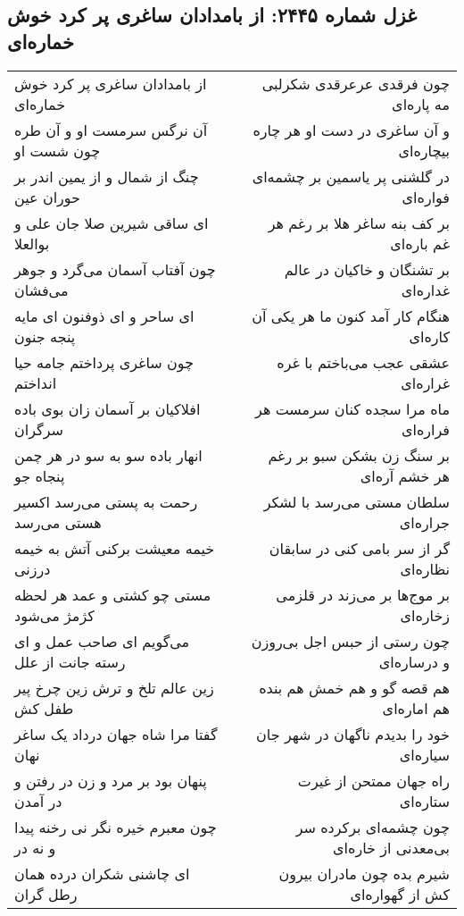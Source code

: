 \begin{center}
\section*{غزل شماره ۲۴۴۵: از بامدادان ساغری پر کرد خوش خماره‌ای}
\label{sec:2445}
\begin{longtable}{l p{0.5cm} r}
از بامدادان ساغری پر کرد خوش خماره‌ای
&&
چون فرقدی عرعرقدی شکرلبی مه پاره‌ای
\\
آن نرگس سرمست او و آن طره چون شست او
&&
و آن ساغری در دست او هر چاره بیچاره‌ای
\\
چنگ از شمال و از یمین اندر بر حوران عین
&&
در گلشنی پر یاسمین بر چشمه‌ای فواره‌ای
\\
ای ساقی شیرین صلا جان علی و بوالعلا
&&
بر کف بنه ساغر هلا بر رغم هر غم باره‌ای
\\
چون آفتاب آسمان می‌گرد و جوهر می‌فشان
&&
بر تشنگان و خاکیان در عالم غداره‌ای
\\
ای ساحر و ای ذوفنون ای مایه پنجه جنون
&&
هنگام کار آمد کنون ما هر یکی آن کاره‌ای
\\
چون ساغری پرداختم جامه حیا انداختم
&&
عشقی عجب می‌باختم با غره غراره‌ای
\\
افلاکیان بر آسمان زان بوی باده سرگران
&&
ماه مرا سجده کنان سرمست هر فراره‌ای
\\
انهار باده سو به سو در هر چمن پنجاه جو
&&
بر سنگ زن بشکن سبو بر رغم هر خشم آره‌ای
\\
رحمت به پستی می‌رسد اکسیر هستی می‌رسد
&&
سلطان مستی می‌رسد با لشکر جراره‌ای
\\
خیمه معیشت برکنی آتش به خیمه درزنی
&&
گر از سر بامی کنی در سابقان نظاره‌ای
\\
مستی چو کشتی و عمد هر لحظه کژمژ می‌شود
&&
بر موج‌ها بر می‌زند در قلزمی زخاره‌ای
\\
می‌گویم ای صاحب عمل و ای رسته جانت از علل
&&
چون رستی از حبس اجل بی‌روزن و درساره‌ای
\\
زین عالم تلخ و ترش زین چرخ پیر طفل کش
&&
هم قصه گو و هم خمش هم بنده هم اماره‌ای
\\
گفتا مرا شاه جهان درداد یک ساغر نهان
&&
خود را بدیدم ناگهان در شهر جان سیاره‌ای
\\
پنهان بود بر مرد و زن در رفتن و در آمدن
&&
راه جهان ممتحن از غیرت ستاره‌ای
\\
چون معبرم خیره نگر نی رخنه پیدا و نه در
&&
چون چشمه‌ای برکرده سر بی‌معدنی از خاره‌ای
\\
ای چاشنی شکران درده همان رطل گران
&&
شیرم بده چون مادران بیرون کش از گهواره‌ای
\\

\end{longtable}
\end{center}
